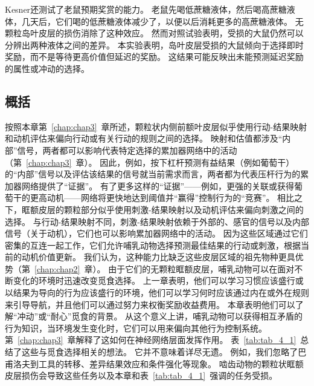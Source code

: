 Kesner\cite{kesner2007role}还测试了老鼠预期奖赏的能力。
老鼠先喝低蔗糖液体，然后喝高蔗糖液体，几天后，它们喝的低蔗糖液体减少了，以便以后消耗更多的高蔗糖液体。
无颗粒岛叶皮层的损伤消除了这种效应。
然而对照试验表明，受损的大鼠仍然可以分辨出两种液体之间的差异。
本实验表明，岛叶皮层受损的大鼠倾向于选择即时奖励，而不是等待更高价值但延迟的奖励。
这结果可能反映出未能预测延迟奖励的属性或冲动的选择。\par



\subsection{概括}

按照本章第~\ref{chap:chap3}~章所述，颗粒状内侧前额叶皮层似乎使用行动-结果映射和动机评估来偏向行动或有关行动的规则之间的选择。
映射和估值都涉及“内部”信号，两者都可以影响代表特定选择的累加器网络中的活动（第~\ref{chap:chap3}~章）。
因此，例如，按下杠杆预测有益结果（例如葡萄干）的“内部”信号以及评估该结果的信号就当前需求而言，两者都为代表压杆行为的累加器网络提供了“证据”。
有了更多这样的“证据”——例如，更强的关联或获得葡萄干的更高动机——网络将更快地达到阈值并“赢得”控制行为的“竞赛”。
相比之下，眶额皮层的颗粒部分似乎使用刺激-结果映射以及动机评估来偏向刺激之间的选择。
与行动-结果映射不同，刺激-结果映射依赖于外部的、感官的信号以及内部信号（关于动机），它们也可以影响累加器网络中的活动。
因为这些区域通过它们密集的互连一起工作\cite{barbas1988anatomic,price2010neurocircuitry}，它们允许哺乳动物选择预测最佳结果的行动或刺激，根据当前的动机价值更新。
我们认为，这种能力比缺乏这些皮层区域的祖先物种更具优势（第~\ref{chap:chap2}~章）。
由于它们的无颗粒眶额皮层，哺乳动物可以在面对不断变化的环境时迅速改变觅食选择。
上一章表明，他们可以学习习惯应该盛行或以结果为导向的行为应该盛行的环境，他们可以学习何时应该通过内在或外在规则来引导导航，并且他们可以通过努力来权衡奖励收益费用。
本章表明他们可以了解“冲动”或“耐心”觅食的背景。
从这个意义上讲，哺乳动物可以获得相互矛盾的行为知识，当环境发生变化时，它们可以用来偏向其他行为控制系统。
第~\ref{chap:chap3}~章解释了这如何在神经网络层面发挥作用。
表~\ref{tab:tab_4_1}~总结了这些与觅食选择相关的想法。
它并不意味着详尽无遗。
例如，我们忽略了巴甫洛夫到工具的转移、差异结果效应和条件强化等现象。
啮齿动物的颗粒状眶额皮层损伤会导致这些任务以及本章和表~\ref{tab:tab_4_1}~强调的任务受损。



